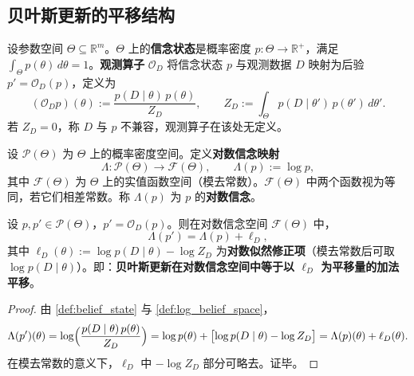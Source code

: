 \subsection{贝叶斯更新的平移结构}\label{subsec:bayesian_translation}

\begin{definition}[信念状态与观测算子]\label{def:belief_state}
设参数空间 $\Theta\subseteq\mathbb{R}^m$。$\Theta$ 上的\textbf{信念状态}是概率密度 $p:\Theta\to\mathbb{R}^+$，满足 $\int_\Theta p(\theta)\,d\theta = 1$。\textbf{观测算子} $\mathcal{O}_D$ 将信念状态 $p$ 与观测数据 $D$ 映射为后验 $p' = \mathcal{O}_D(p)$，定义为
\[
(\mathcal{O}_D p)(\theta) := \frac{p(D\mid\theta)\,p(\theta)}{Z_D}, \qquad Z_D := \int_\Theta p(D\mid\theta')\,p(\theta')\,d\theta'.
\]
若 $Z_D = 0$，称 $D$ 与 $p$ 不兼容，观测算子在该处无定义。
\end{definition}

\begin{definition}[对数信念空间]\label{def:log_belief_space}
设 $\mathcal{P}(\Theta)$ 为 $\Theta$ 上的概率密度空间。定义\textbf{对数信念映射}
\[
\Lambda:\mathcal{P}(\Theta)\to \mathcal{F}(\Theta), \qquad \Lambda(p) := \log p,
\]
其中 $\mathcal{F}(\Theta)$ 为 $\Theta$ 上的实值函数空间（模去常数）。$\mathcal{F}(\Theta)$ 中两个函数视为等同，若它们相差常数。称 $\Lambda(p)$ 为 $p$ 的\textbf{对数信念}。
\end{definition}

\begin{theorem}[贝叶斯更新的平移结构]\label{thm:bayesian_translation_structure}
设 $p,p'\in\mathcal{P}(\Theta)$，$p' = \mathcal{O}_D(p)$。则在对数信念空间 $\mathcal{F}(\Theta)$ 中，
\[
\boxed{\ \Lambda(p') = \Lambda(p) + \ell_D,\ }
\]
其中 $\ell_D(\theta) := \log p(D\mid\theta) - \log Z_D$ 为\textbf{对数似然修正项}（模去常数后可取 $\log p(D\mid\theta)$）。即：\textbf{贝叶斯更新在对数信念空间中等于以 $\ell_D$ 为平移量的加法平移}。
\end{theorem}

\begin{proof}
由 \cref{def:belief_state} 与 \cref{def:log_belief_space}，
\[
\Lambda(p')(\theta) = \log\Bigl(\frac{p(D\mid\theta)\,p(\theta)}{Z_D}\Bigr) = \log p(\theta) + \bigl[\log p(D\mid\theta) - \log Z_D\bigr] = \Lambda(p)(\theta) + \ell_D(\theta).
\]
在模去常数的意义下，$\ell_D$ 中 $-\log Z_D$ 部分可略去。证毕。
\end{proof}

